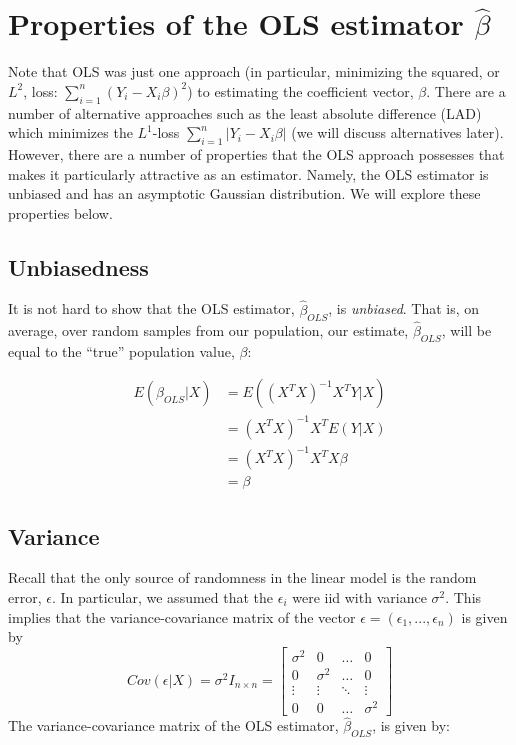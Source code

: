 %
\section{Properties of the OLS estimator $\hat{\beta}$}

Note that OLS was just one approach (in particular, minimizing the squared, or $L^2$, loss: $\sum_{i=1}^n(Y_i - X_i \beta)^2$) to estimating the coefficient vector, $\beta$. There are a number of alternative approaches such as the least absolute difference (LAD) which minimizes the $L^1$-loss $\sum_{i=1}^n|Y_i - X_i \beta|$ (we will discuss alternatives later). However, there are a number of properties that the OLS approach possesses that makes it particularly attractive as an estimator. Namely, the OLS estimator is unbiased and has an asymptotic Gaussian distribution. We will explore these properties below.


\subsection*{Unbiasedness}

It is not hard to show that the OLS estimator, $\hat{\beta}_{OLS}$, is \textit{unbiased}. That is, on average, over random samples from our population, our estimate, $\hat{\beta}_{OLS}$, will be equal to the ``true'' population value, $\beta$:

\begin{align*}
E\left(\hat{\beta}_{OLS} \Big| X\right) &= E\left( (X^TX)^{-1}X^TY \Big| X \right)\\
& = (X^TX)^{-1}X^T E(Y | X)\\
& = (X^TX)^{-1}X^T X\beta\\
& = \beta
\end{align*}

\subsection*{Variance}

Recall that the only source of randomness in the linear model is the random error, $\epsilon$. In particular, we assumed that the $\epsilon_i$ were iid with variance $\sigma^2$. This implies that the variance-covariance matrix of the vector $\epsilon = (\epsilon_1, ..., \epsilon_n)$ is given by
$$Cov(\epsilon | X) = \sigma^2 I _{n \times n} = \left[ \begin{array}{cccc} \sigma^2 & 0 & \dots & 0\\
0 & \sigma^2 & \dots & 0 \\
\vdots & \vdots & \ddots & \vdots \\
0 & 0 & \dots & \sigma^2 \end{array} \right]$$
The variance-covariance matrix of the OLS estimator, $\hat{\beta}_{OLS}$, is given by:


